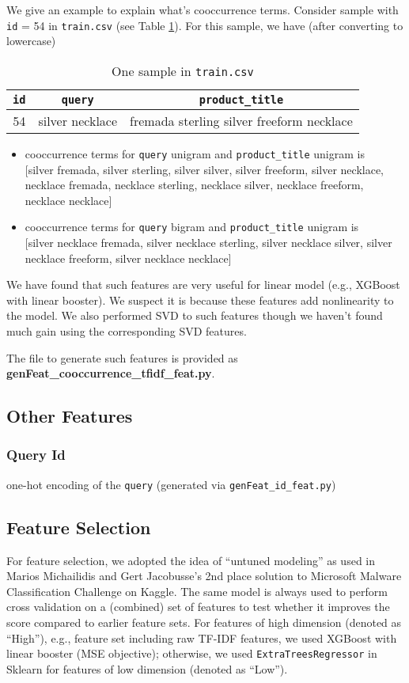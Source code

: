 \documentclass[12pt]{article}
\begin{document}
We give an example to explain what's cooccurrence terms. Consider sample with \texttt{id} = 54 in \texttt{train.csv} (see Table \ref{tab:sample_id54}). For this sample, we have (after converting to lowercase)
\begin{table}[!htb]
\centering
\caption{One sample in \texttt{train.csv}}
\label{tab:sample_id54}
\begin{tabular}{|c|c|c|}
\hline
\texttt{id} & \texttt{query} & \texttt{product\_title} \\
\hline
54 & silver necklace & fremada sterling silver freeform necklace\\
\hline
\end{tabular}
\end{table}
\begin{itemize}
\item cooccurrence terms for \texttt{query} unigram and \texttt{product\_title} unigram is\\
$[$silver fremada, silver sterling, silver silver, silver freeform, silver necklace, necklace fremada, necklace sterling, necklace silver, necklace freeform, necklace necklace$]$
\item cooccurrence terms for \texttt{query} bigram and \texttt{product\_title} unigram is\\
$[$silver necklace fremada, silver necklace sterling, silver necklace silver, silver necklace freeform, silver necklace necklace$]$
\end{itemize}
We have found that such features are very useful for linear model (e.g., XGBoost with linear booster). We suspect it is because these features add nonlinearity to the model. We also performed SVD to such features though we haven't found much gain using the corresponding SVD features.

The file to generate such features is provided as \textbf{genFeat\_cooccurrence\_tfidf\_feat.py}.


\subsection{Other Features}
\subsubsection{Query Id}
one-hot encoding of the \texttt{query} (generated via \texttt{genFeat\_id\_feat.py})

\subsection{Feature Selection}
For feature selection, we adopted the idea of ``untuned modeling'' as used in Marios Michailidis and Gert Jacobusse's 2nd place solution \cite{malware_2nd} to Microsoft Malware Classification Challenge on Kaggle. The same model is always used to perform cross validation on a (combined) set of features to test whether it improves the
score compared to earlier feature sets. For features of high dimension (denoted as ``High''), e.g., feature set including raw TF-IDF features, we used XGBoost with linear booster (MSE objective); otherwise, we used \texttt{ExtraTreesRegressor} in Sklearn for features of low dimension (denoted as ``Low'').
\end{document}
